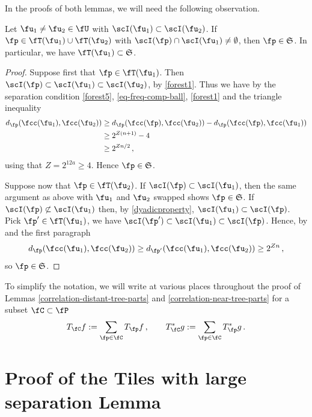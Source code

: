 In the proofs of both lemmas, we will need the following observation.

\begin{lemma}
    \label{overlap-implies-distance}
    \leanok
    Let $\fu_1 \ne \fu_2 \in \fU$ with $\scI(\fu_1) \subset \scI(\fu_2)$. If $\fp \in \fT(\fu_1) \cup \fT(\fu_2)$ with $\scI(\fp) \cap \scI(\fu_1) \ne \emptyset$, then $\fp \in \mathfrak{S}$. In particular, we have $\fT(\fu_1) \subset \mathfrak{S}$.
\end{lemma}

\begin{proof}
    \leanok
    Suppose first that $\fp \in \fT(\fu_1)$. Then $\scI(\fp) \subset \scI(\fu_1) \subset \scI(\fu_2)$, by \eqref{forest1}. Thus we have by the separation condition \eqref{forest5}, \eqref{eq-freq-comp-ball}, \eqref{forest1} and the triangle inequality
    \begin{align*}
        d_{\fp}(\fcc(\fu_1), \fcc(\fu_2)) &\ge d_{\fp}(\fcc(\fp), \fcc(\fu_2)) - d_{\fp}(\fcc(\fp), \fcc(\fu_1))\\
        &\ge 2^{Z(n+1)} - 4\\
        &\ge 2^{Zn/2}\,,
    \end{align*}
    using that $Z= 2^{12a}\ge 4$. Hence $\fp \in \mathfrak{S}$.

    Suppose now that $\fp \in \fT(\fu_2)$. If $\scI(\fp) \subset \scI(\fu_1)$, then the same argument as above with $\fu_1$ and $\fu_2$ swapped shows $\fp \in \mathfrak{S}$. If $\scI(\fp) \not \subset \scI(\fu_1)$ then, by \eqref{dyadicproperty}, $\scI(\fu_1) \subset \scI(\fp)$. Pick $\fp' \in \fT(\fu_1)$, we have $\scI(\fp') \subset \scI(\fu_1) \subset \scI(\fp)$. Hence, by  and the first paragraph
    $$
        d_{\fp}(\fcc(\fu_1), \fcc(\fu_2)) \ge d_{\fp'}(\fcc(\fu_1), \fcc(\fu_2)) \ge 2^{Zn}\,,
    $$
    so $\fp \in \mathfrak{S}$.
\end{proof}

To simplify the notation, we will write at various places throughout the proof of Lemmas \ref{correlation-distant-tree-parts} and \ref{correlation-near-tree-parts} for a subset $\fC \subset \fP$
$$
    T_{\fC} f := \sum_{\fp \in \fC} T_{\fp} f\,, \quad\quad T_{\fC}^* g := \sum_{\fp\in\fC} T_{\fp}^* g\,.
$$

\section{Proof of the Tiles with large separation Lemma}
    \label{subsec-big-tiles}

